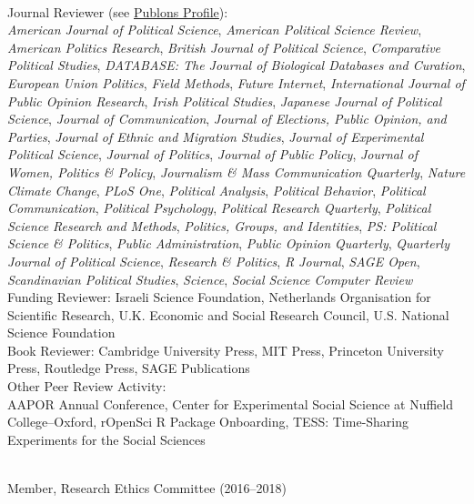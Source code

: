 \documentclass[12pt]{article}
\renewcommand{\section}[1]{\pagebreak[3]%
    \llap{\scshape\smash{\parbox[t]{\marginparwidth}{\raggedright {\color{lg}#1}}}}%
    \vspace{-\baselineskip}\par}
\newcommand{\topic}[1]{\pagebreak[3]\indent {\color{lg}{\footnotesize #1 }}\\}
\newcommand{\entry}[1]{\indent {\color{lg}\guillemotright}\hspace{2pt}#1\vspace{.25em}\\}
\begin{document}
{\topic{Peer Review Activity}
	\entry{Journal Reviewer (see \href{https://publons.com/a/634082/}{Publons Profile}):\\\textit{American Journal of Political Science}, \textit{American Political Science Review}, \textit{American Politics Research}, \textit{British Journal of Political Science}, \textit{Comparative Political Studies}, \textit{DATABASE: The Journal of Biological Databases and Curation}, \textit{European Union Politics}, \textit{Field Methods}, \textit{Future Internet}, \textit{International Journal of Public Opinion Research}, \textit{Irish Political Studies}, \textit{Japanese Journal of Political Science}, \textit{Journal of Communication}, \textit{Journal of Elections, Public Opinion, and Parties}, \textit{Journal of Ethnic and Migration Studies}, \textit{Journal of Experimental Political Science}, \textit{Journal of Politics}, \textit{Journal of Public Policy}, \textit{Journal of Women, Politics \& Policy}, \textit{Journalism \& Mass Communication Quarterly}, \textit{Nature Climate Change}, \textit{PLoS One}, \textit{Political Analysis}, \textit{Political Behavior}, \textit{Political Communication}, \textit{Political Psychology}, \textit{Political Research Quarterly}, \textit{Political Science Research and Methods}, \textit{Politics, Groups, and Identities}, \textit{PS: Political Science \& Politics}, \textit{Public Administration}, \textit{Public Opinion Quarterly}, \textit{Quarterly Journal of Political Science}, \textit{Research \& Politics}, \textit{R Journal}, \textit{SAGE Open}, \textit{Scandinavian Political Studies}, \textit{Science}, \textit{Social Science Computer Review}}
	\entry{Funding Reviewer: Israeli Science Foundation, Netherlands Organisation for Scientific Research, U.K. Economic and Social Research Council, U.S. National Science Foundation}
	\entry{Book Reviewer: Cambridge University Press, MIT Press, Princeton University Press, Routledge Press, SAGE Publications}
	\entry{Other Peer Review Activity:\\ AAPOR Annual Conference, Center for Experimental Social Science at Nuffield College--Oxford, rOpenSci R Package Onboarding, TESS: Time-Sharing Experiments for the Social Sciences}

\section{Institutional\\ \& Professional Service}
\topic{Institutional (London School of Economics and Political Science)}
	\entry{Member, Research Ethics Committee (2016--2018)}
	
}
\end{document}
